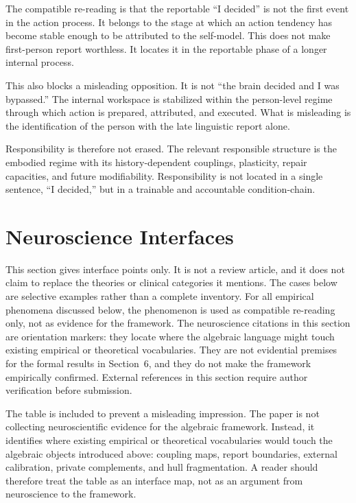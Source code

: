 \documentclass[12pt]{article}
\theoremstyle{definition}
\theoremstyle{remark}
\begin{document}
The compatible re-reading is that the reportable ``I decided'' is not
the first event in the action process. It belongs to the stage at which
an action tendency has become stable enough to be attributed to the
self-model. This does not make first-person report worthless. It
locates it in the reportable phase of a longer internal process.

This also blocks a misleading opposition. It is not ``the brain decided
and I was bypassed.'' The internal workspace is stabilized within the
person-level regime through which action is prepared, attributed, and
executed. What is misleading is the identification of the person with
the late linguistic report alone.

Responsibility is therefore not erased. The relevant responsible
structure is the embodied regime with its history-dependent couplings,
plasticity, repair capacities, and future modifiability. Responsibility
is not located in a single sentence, ``I decided,'' but in a trainable
and accountable condition-chain.

\section{Neuroscience Interfaces}

This section gives interface points only. It is not a review article,
and it does not claim to replace the theories or clinical categories it
mentions. The cases below are selective examples rather than a complete
inventory. For all empirical phenomena discussed below, the phenomenon
is used as compatible re-reading only, not as evidence for the
framework. The neuroscience citations in this section are orientation
markers: they locate where the algebraic language might touch existing
empirical or theoretical vocabularies. They are not evidential premises
for the formal results in Section~6, and they do not make the framework
empirically confirmed. External references in this section require
author verification before submission.

The table is included to prevent a misleading impression. The paper is
not collecting neuroscientific evidence for the algebraic framework.
Instead, it identifies where existing empirical or theoretical
vocabularies would touch the algebraic objects introduced above:
coupling maps, report boundaries, external calibration, private
complements, and hull fragmentation. A reader should therefore treat
the table as an interface map, not as an argument from neuroscience to
the framework.
\end{document}
